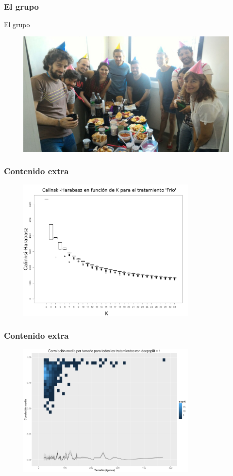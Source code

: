 \documentclass[serif,9pt, t]{beamer}
\begin{document}
\begin{frame}\frametitle{El grupo}
\Huge
\centering
El grupo
\begin{figure}
\centering
\includegraphics[width=1\textwidth]{grupo.jpeg}
\end{figure}
\end{frame}
\begin{frame}\frametitle{Contenido extra}
\begin{figure}
\centering
\includegraphics[width=0.8\textwidth]{extras/barrido_k_ch}
\end{figure}
\end{frame}

\begin{frame}\frametitle{Contenido extra}
\begin{figure}
\centering
\includegraphics[width=0.8\textwidth]{extras/correlacion_media_por_tamano_ds_1}
\end{figure}
\end{frame}
\end{document}
